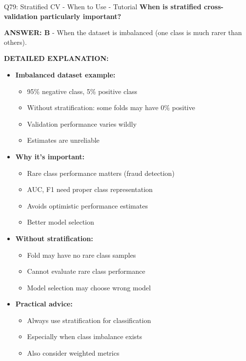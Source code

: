 \documentclass[8pt]{beamer}
\begin{document}
	\begin{frame}{Q79: Stratified CV - When to Use - Tutorial}
		\fontsize{6.5}{7.5}\selectfont
		\textbf{When is stratified cross-validation particularly important?}
		
		\vspace{0.05cm}
		\textcolor{myblue}{\textbf{ANSWER: B}} - When the dataset is imbalanced (one class is much rarer than others).
		
		\vspace{0.05cm}
		\textbf{DETAILED EXPLANATION:}
		\begin{itemize}
			\item \textbf{Imbalanced dataset example:}
			\begin{itemize}
				\item 95\% negative class, 5\% positive class
				\item Without stratification: some folds may have 0\% positive
				\item Validation performance varies wildly
				\item Estimates are unreliable
			\end{itemize}
			\item \textbf{Why it's important:}
			\begin{itemize}
				\item Rare class performance matters (fraud detection)
				\item AUC, F1 need proper class representation
				\item Avoids optimistic performance estimates
				\item Better model selection
			\end{itemize}
			\item \textbf{Without stratification:}
			\begin{itemize}
				\item Fold may have no rare class samples
				\item Cannot evaluate rare class performance
				\item Model selection may choose wrong model
			\end{itemize}
			\item \textbf{Practical advice:}
			\begin{itemize}
				\item Always use stratification for classification
				\item Especially when class imbalance exists
				\item Also consider weighted metrics
			\end{itemize}
		\end{itemize}
		

\end{frame}
\end{document}
